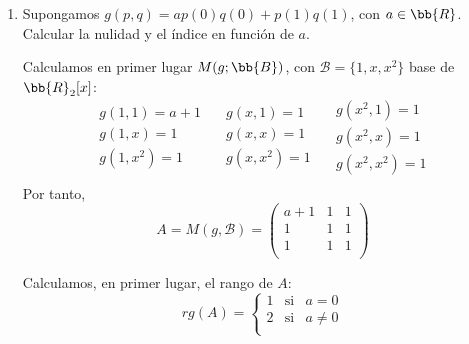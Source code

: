 \begin{ejercicio}
\begin{enumerate}
        \item Supongamos $g(p,q) = ap(0)q(0) + p(1)q(1)$, con $a\in \bb{R}$. Calcular la nulidad y el índice en función de $a$.

        Calculamos en primer lugar $M(g; \bb{B})$, con $\mathcal{B}=\{1,x,x^2\}$ base de $\bb{R}_2[x]$:
        \begin{equation*}
            \begin{array}{l}
                g(1,1)=a+1 \\
                g(1,x)=1 \\
                g(1,x^2)= 1\\
            \end{array}
            \quad
            \begin{array}{l}
                g(x,1)=1 \\
                g(x,x)=1 \\
                g(x,x^2)= 1\\
            \end{array}
            \quad
            \begin{array}{l}
                g(x^2,1)=1 \\
                g(x^2,x)=1 \\
                g(x^2,x^2)= 1\\
            \end{array}
        \end{equation*}
        Por tanto,
        \begin{equation*}
            A = M(g, \mathcal{B}) = \left( \begin{array}{ccc}
                a+1 & 1 & 1 \\
                1 & 1 & 1 \\
                1 & 1 & 1 \\
            \end{array}\right)
        \end{equation*}

        Calculamos, en primer lugar, el rango de $A$:
        \begin{equation*}
            rg(A) = \left\{ \begin{array}{ccc}
            1 & \text{si} & a=0 \\
            2 & \text{si} & a\neq 0 \\
            \end{array} \right.
        \end{equation*}


\end{enumerate}
\end{ejercicio}
